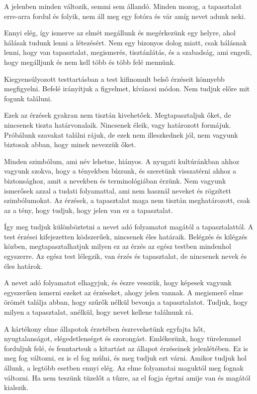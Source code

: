 A jelenben minden változik, semmi sem állandó. Minden mozog, a
tapasztalat erre-arra fordul és folyik, nem áll meg egy fotóra és vár
amíg nevet adunk neki.

Ennyi elég, így ismerve az elmét megállunk és megérkezünk egy helyre,
ahol hálásak tudunk lenni a létezésért. Nem egy bizonyos dolog miatt,
csak hálásnak lenni, hogy van tapasztalat, megismerés, tisztánlátás, és
a szabadság, ami engedi, hogy megálljunk és nem kell több és több felé
mennünk.

Kiegyensúlyozott testtartásban a test kifinomult belső érzéseit könnyebb
megfigyelni. Befelé irányítjuk a figyelmet, kíváncsi módon. Nem tudjuk
előre mit fogunk találuni.

Ezek az érzések gyakran nem tisztán kivehetőek. Megtapasztaljuk őket, de
nincsenek tiszta határvonalaik. Nincsenek éleik, vagy határozott
formájuk. Próbálunk szavakat találni rájuk, de ezek nem illeszkednek
jól, nem vagyunk biztosak abban, hogy minek nevezzük őket.

Minden szimbólum, ami név lehetne, hiányos. A nyugati kultúránkban ahhoz
vagyunk szokva, hogy a tényekben bízzunk, és szeretünk visszatérni ahhoz
a biztonsághoz, amit a nevekben és terminológiában érzünk. Nem vagyunk
ismerősek azzal a tudati folyamattal, ami nem használ neveket és
rögzített szimbólumokat. Az érzések, a tapasztalat maga nem tisztán
meghatározott, csak az a tény, hogy tudjuk, hogy jelen van ez a
tapasztalat.

Így meg tudjuk különböztetni a nevet adó folyamatot magától a
tapasztalattól. A test érzései kifejezetten ködszerűek, nincsenek éles
határaik. Belégzés és kilégzés közben, megtapasztalhatjuk milyen ez az
érzés az egész testben mindenhol egyszerre. Az egész test lélegzik, van
érzés és tapasztalat, de nincsenek nevek és éles határok.

A nevet adó folyamatot elhagyjuk, és észre vesszük, hogy képesek vagyunk
egyszerűen ismerni ezeket az érzéseket, ahogy jelen vannak. A megismerő
elme örömét találja abban, hogy szűrők nélkül bevonja a tapasztalatot.
Tudjuk, hogy milyen a tapasztalat, anélkül, hogy nevet kellene találnunk
rá.

A kártékony elme állapotok érzetében észrevehetünk egyfajta hőt,
nyugtalanságot, elégedetlenséget és szorongást. Emlékezünk, hogy
türelemmel forduljuk felé, és fenntartsuk a kitartást az állapot
érzéseinek jelenlétében. Ez is meg fog változni, ez is el fog múlni, és
meg tudjuk ezt várni. Amikor tudjuk hol állunk, a legtöbb esetben ennyi
elég. Az elme folyamatai maguktól meg fognak változni. Ha nem teszünk
tüzelőt a tűzre, az el fogja égetni amije van és magától kialszik.


